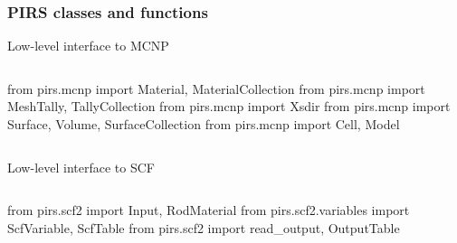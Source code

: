 \begin{frame}[fragile]
    \frametitle{PIRS classes and functions}

    \begin{block}{Low-level interface to MCNP}
    \begin{columns}
        \begin{pythoncode}
        from pirs.mcnp import Material, MaterialCollection
        from pirs.mcnp import MeshTally, TallyCollection
        from pirs.mcnp import Xsdir
        from pirs.mcnp import Surface, Volume, SurfaceCollection
        from pirs.mcnp import Cell, Model
        \end{pythoncode}
    \end{columns}
    \end{block}

    \begin{block}{Low-level interface to SCF}
    \begin{columns}
        \begin{pythoncode}
        from pirs.scf2 import Input, RodMaterial
        from pirs.scf2.variables import ScfVariable, ScfTable
        from pirs.scf2 import read_output, OutputTable
        \end{pythoncode}
    \end{columns}
    \end{block}
\end{frame}


